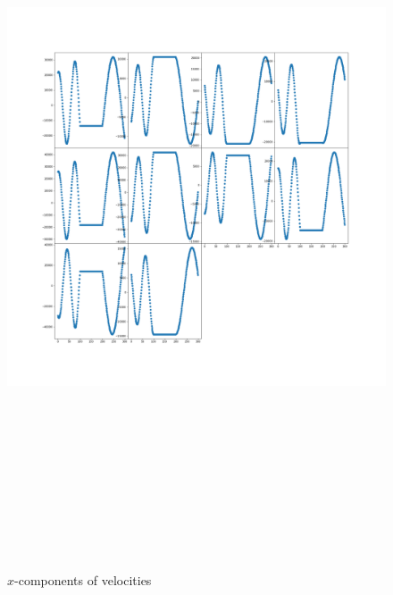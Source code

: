 \documentclass[12pt]{article}
\begin{document}
	\begin{figure}[H]
		\includegraphics[width=\linewidth, height=22cm]{subvsx3.png} \caption{$x$-components of velocities} \label{subvsx3}
	\end{figure}
\end{document}
